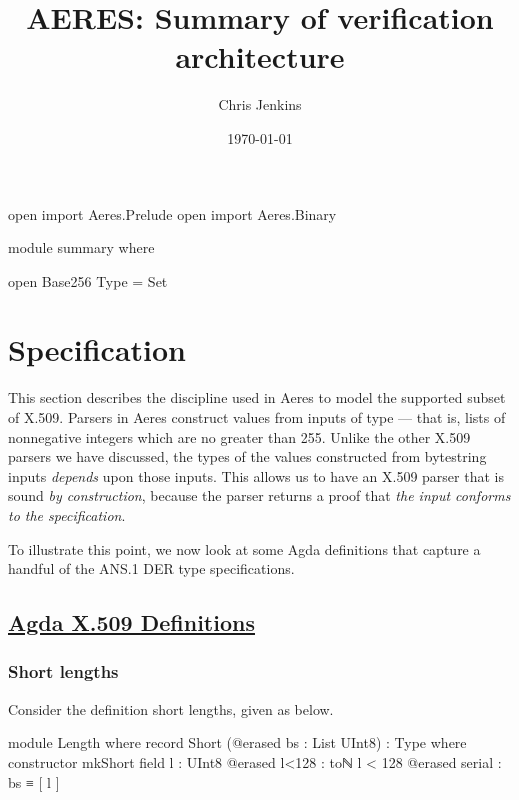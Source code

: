 \documentclass[11pt]{article}
\author{Chris Jenkins}
\date{\today}
\title{AERES: Summary of verification architecture}
\begin{document}
\maketitle
\begin{code}[hide]
open import Aeres.Prelude
open import Aeres.Binary

module summary where

open Base256
Type = Set
\end{code}

\section{Specification}
\label{sec:org5299f5e}

This section describes the discipline used in Aeres to model the supported
subset of X.509.
Parsers in Aeres construct values from inputs of type
\AgdaSpace{} --- that is, lists of
nonnegative integers which are no greater than 255.
Unlike the other X.509 parsers we have discussed, the types of the values
constructed from bytestring inputs \emph{depends} upon those inputs.
This allows us to have an X.509 parser that is sound \emph{by construction},
because the parser returns a proof that \emph{the input conforms to the
specification}.

To illustrate this point, we now look at some Agda definitions that capture a
handful of the ANS.1 DER type specifications.


\subsection{\href{../src/Aeres/Data/X509.agda}{Agda X.509 Definitions}}
\label{sec:orgd15167b}
\subsubsection{Short lengths}
\label{sec:orgc686d71}
Consider the definition short lengths, given as  below.

\begin{code}
module Length where
  record Short (@erased bs : List UInt8) : Type where
    constructor mkShort
    field
      l : UInt8
      @erased l<128 : toℕ l < 128
      @erased serial : bs ≡ [ l ]
\end{code}
\end{document}
